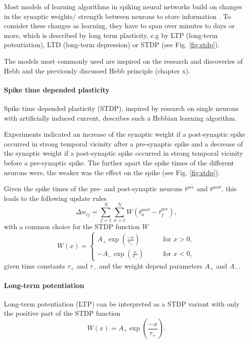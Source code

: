 Most models of learning algorithms in spiking neural networks build on changes in the synaptic weights/ strength between neurons to store information \cite{gerstner2014neuronal}.
To consider these changes as learning, they have to span over minutes to days or more, which is described by long term plasticity, e.g by LTP (long-term potentiation), LTD (long-term depression) or STDP (see Fig. \ref{fig:stdp}).
 
The models most commonly used are inspired on the research and discoveries of Hebb and the previously discussed Hebb principle (chapter x).

\paragraph{Spike time depended plasticity}

Spike time depended plasticity (STDP), inspired by research on single neurons with artificially induced current, describes such a Hebbian learning algorithm.

Experiments indicated an increase of the synaptic weight if a post-synaptic spike occurred in strong temporal vicinity after a pre-synaptic spike and a decrease of the synaptic weight if a post-synaptic spike occurred in strong temporal vicinity before a pre-synaptic spike.
The further apart the spike times of the different neurons were, the weaker was the effect on the spike (see Fig. \ref{fig:stdp}).

Given the spike times of the pre- and post-synaptic neurons $t^{pre}$ and $t^{post}$, this leads to the following update rules \cite{gerstner2014neuronal}\cite{Sjostrom2010}
\[
\Delta w_{ij} = \sum_{f=1}^N \sum_{n=1}^N W(t^{post}_n - t^{pre}_f),
\]
with a common choice for the STDP function $W$
\[
W(x) =
\begin{cases}
A_+ \exp(\frac{-x}{\tau_+}) \quad \quad &\text{for  } x > 0,  \\
-A_- \exp(\frac{x}{\tau_-}) \quad \quad &\text{for  } x < 0,
\end{cases}
\]
given time constants $\tau_+$ and $\tau_-$ and the weight depend parameters $A_+$ and $A_-$.
     

\paragraph{Long-term potentiation}
 
Long-term potentiation (LTP) can be interpreted as a STDP variant with only the positive part of the STDP function
\[
W(x) =  A_+ \exp(\frac{-x}{\tau_+}).
\]

